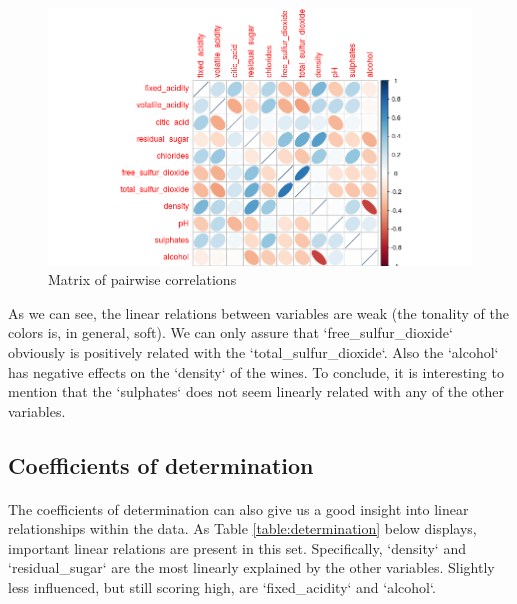 \documentclass[10pt]{article}
\begin{document}
\begin{figure}[H]
	\centering
	\includegraphics[width=5.2in]{figures/correlations.png}
	\caption{Matrix of pairwise correlations} 
	\label{figure:correlationsy}
\end{figure}

As we can see, the linear relations between variables are weak (the tonality of the colors is, in general, soft). We can only assure that `free\_sulfur\_dioxide` obviously is positively related with the `total\_sulfur\_dioxide`. Also the `alcohol` has negative effects on the `density` of the wines. To conclude, it is interesting to mention that the `sulphates` does not seem linearly related with any of the other variables. 

\subsection{Coefficients of determination}
\paragraph*{}
The coefficients of determination can also give us a good insight into linear relationships within the data. As Table \ref{table:determination} below displays, important linear relations are present in this set. Specifically, `density` and `residual\_sugar` are the most linearly explained by the other variables. Slightly less influenced, but still scoring high, are `fixed\_acidity` and `alcohol`.
\end{document}
